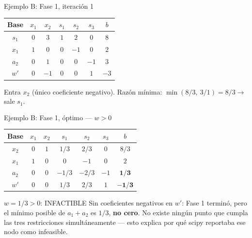 \documentclass[aspectratio=169]{beamer}
\begin{document}
\begin{frame}{Ejemplo B: Fase 1, iteración 1}
\begin{center}
\renewcommand{\arraystretch}{1.2}
\small
\begin{tabular}{c|ccccc|c}
\textbf{Base} & $x_1$ & $x_2$ & $s_1$ & $s_2$ & $s_3$ & $b$ \\
\hline
$s_1$ & $0$ & $3$ & $1$ & $2$ & $0$ & $8$ \\
$x_1$ & $1$ & $0$ & $0$ & $-1$ & $0$ & $2$ \\
$a_2$ & $0$ & $1$ & $0$ & $0$ & $-1$ & $3$ \\
\hline
$w'$ & $0$ & \cellcolor{entra!20}$-1$ & $0$ & $0$ & $1$ & $-3$ \\
\end{tabular}
\end{center}
\normalsize

\vspace{0.2cm}
Entra $x_2$ (único coeficiente negativo). Razón mínima: $\min(8/3,\ 3/1)=8/3\to$ sale $s_1$.
\end{frame}

\begin{frame}{Ejemplo B: Fase 1, óptimo --- $w>0$}
\begin{center}
\renewcommand{\arraystretch}{1.2}
\small
\begin{tabular}{c|ccccc|c}
\textbf{Base} & $x_1$ & $x_2$ & $s_1$ & $s_2$ & $s_3$ & $b$ \\
\hline
$x_2$ & $0$ & $1$ & $1/3$ & $2/3$ & $0$ & $8/3$ \\
$x_1$ & $1$ & $0$ & $0$ & $-1$ & $0$ & $2$ \\
$a_2$ & $0$ & $0$ & $-1/3$ & $-2/3$ & $-1$ & $\mathbf{1/3}$ \\
\hline
$w'$ & $0$ & $0$ & $1/3$ & $2/3$ & $1$ & $\mathbf{-1/3}$ \\
\end{tabular}
\end{center}
\normalsize

\begin{alertblock}{$w=1/3>0$: INFACTIBLE}
Sin coeficientes negativos en $w'$: Fase 1 terminó, pero el mínimo posible de $a_1+a_2$ es $1/3$, \textbf{no cero}. No existe ningún punto que cumpla las tres restricciones simultáneamente --- esto explica por qué scipy reportaba ese nodo como infeasible.
\end{alertblock}
\end{frame}
\end{document}
